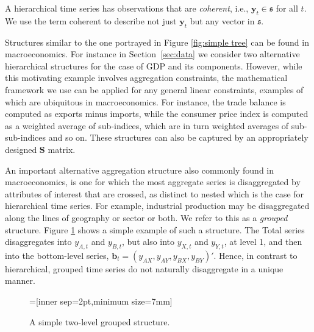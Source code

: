 \documentclass[graybox]{svmult}
\begin{document}
\begin{property}
A hierarchical time series has observations that are \textit{coherent}, i.e., $\bm{y}_{t} \in \mathfrak{s}$ for all $t$. We use the term coherent to describe not just $\bm{y}_t$ but any vector in $\mathfrak{s}$.
  \label{prop:coherence}
\end{property}


Structures similar to the one portrayed in Figure \ref{fig:simple tree} can be found in macroeconomics. For instance in Section~\ref{sec:data} we consider two alternative hierarchical structures for the case of GDP and its components.  However, while this motivating example involves aggregation constraints, the mathematical framework we use can be applied for any general linear constraints, examples of which are ubiquitous in macroeconomics. For instance, the trade balance is computed as exports minus imports, while the consumer price index is computed as a weighted average of sub-indices, which are in turn weighted averages of sub-sub-indices and so on.  These structures can also be captured by an appropriately designed $\bm{S}$ matrix.

An important alternative aggregation structure also commonly found in macroeconomics, is one for which the most aggregate series is disaggregated by attributes of interest that are crossed, as distinct to nested which is the case for hierarchical time series. For example, industrial production may be disaggregated along the lines of geography or sector or both. We refer to this as a \textit{grouped} structure. Figure \ref{fig:simple grouped tree} shows a simple example of such a structure. The Total series disaggregates into $y_{A,t}$ and $y_{B,t}$, but also into $y_{X,t}$ and $y_{Y,t}$, at level 1, and then into the bottom-level series, $\bm{b}_t=(y_{AX}, y_{AY}, y_{BX}, y_{BY})'$. Hence, in contrast to hierarchical, grouped time series do not naturally disaggregate in a unique manner.
\begin{figure}[!hbt]
\center
{}=[inner sep=2pt,minimum size=7mm]
  \caption{A simple two-level grouped structure.}
  \label{fig:simple grouped tree}
\end{figure}
\end{document}
